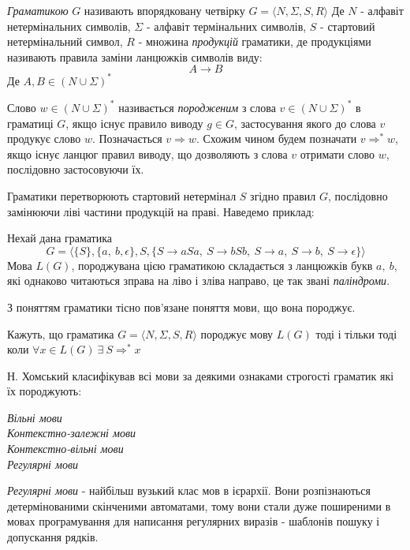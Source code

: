 \begin{definition}
  \textit{Граматикою} $ G $ називають впорядковану четвірку $ G = \big\langle N, \Sigma, S, R \big\rangle $ Де $N$ - алфавіт нетермінальних символів, $\Sigma$ - алфавіт термінальних символів,
  $S$ - стартовий нетермінальний символ, $R$ - множина \textit{продукцій} граматики, де продукціями називають правила заміни ланцюжків символів виду:
  $$ A \rightarrow B $$
  Де $ A,B \in \left(N \cup \Sigma \right)^* $
\end{definition}
\begin{definition}
  Слово $ w \in \left(N \cup \Sigma \right)^* $ називається \textit{породженим} з слова $ v \in \left(N \cup \Sigma \right)^* $ в граматиці $G$, якщо існує правило виводу $ g \in G $, застосування якого до слова $v$ продукує слово $w$. Позначається $v \Rightarrow w$.
  Схожим чином будем позначати $v \Rightarrow^* w$, якщо існує ланцюг правил виводу, що дозволяють з слова $v$ отримати слово $w$, послідовно застосовуючи їх.
\end{definition}
Граматики перетворюють стартовий нетермінал $S$ згідно правил $G$, послідовно замінюючи ліві частини продукцій на праві. Наведемо приклад:
\begin{example}
  Нехай дана граматика
  $$ G = \big\langle \{ S \}, \{ a,\ b, \epsilon \}, S, \{ S \rightarrow aSa,\ S \rightarrow bSb,\ S \rightarrow a,\ S \rightarrow b,\ S \rightarrow \epsilon \} \big\rangle $$
  Мова $L(G)$, породжувана цією граматикою складається з ланцюжків букв $a,\ b$, які однаково читаються зправа на ліво і зліва направо,
  це так звані \textit{паліндроми}.
\end{example}
З поняттям граматики тісно пов'язане поняття мови, що вона породжує.
\begin{definition}
  Кажуть, що граматика $ G = \big\langle N, \Sigma, S, R \big\rangle $ породжує мову $ L(G) $ тоді і тільки тоді коли $ \forall x \in L(G)\ \exists \ S \Rightarrow^* x $
\end{definition}
Н. Хомський класифікував всі мови за деякими ознаками строгості граматик які їх породжують:
\begin{center}
  \textit{
  Вільні мови\\
  Контекстно-залежні мови\\
  Контекстно-вільні мови\\
  Регулярні мови
  }
\end{center}

\textit{Регулярні мови} - найбільш вузький клас мов в ієрархії. Вони розпізнаються детермінованими скінченими автоматами, тому вони стали дуже поширеними в мовах програмування для написання регулярних виразів - шаблонів пошуку і допускання рядків.

